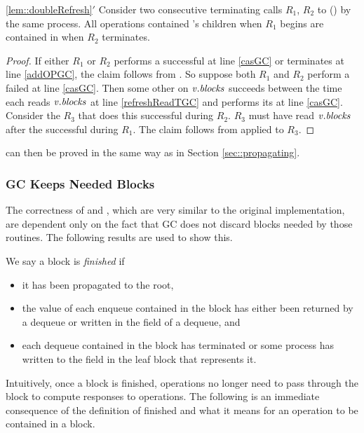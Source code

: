 \begin{customlemma}{\ref{lem::doubleRefresh}$'$}\label{lem::doubleRefreshGC}
Consider two consecutive terminating calls $R_1$, $R_2$ to () by the same process.
All operations contained 's children when $R_1$ begins
are contained in  when $R_2$ terminates.
\end{customlemma}
\begin{proof}
If either $R_1$ or $R_2$ performs a successful  at line \ref{casGC} or terminates at line \ref{addOPGC}, the claim follows
from .
So suppose both $R_1$ and $R_2$ perform a failed  at line \ref{casGC}.
Then some other  on $\mbox{\textnormal{\textit{v}}}.\mbox{\textit{blocks}}$ succeeds between the time each 
reads $\mbox{\textnormal{\textit{v}}}.\mbox{\textit{blocks}}$ at line \ref{refreshReadTGC} and performs its  at line \ref{casGC}.
Consider the  $R_3$ that does this successful  during $R_2$.
$R_3$ must have read $\mbox{\textnormal{\textit{v}}}.\mbox{\textit{blocks}}$ after the successful  during $R_1$.
The claim follows from  applied to $R_3$.
\end{proof}

 can then be proved in the same way as in Section \ref{sec::propagating}.


\subsubsection{GC Keeps Needed Blocks}

The correctness of  and , which are very similar to the 
original implementation, are dependent only on the fact that GC does not 
discard blocks needed by those routines.
The following results are used to show this.

We say a block is \emph{finished} if 
\begin{itemize}
\item
it has been propagated to the root,
\item
the value of each enqueue contained in the block has either been returned by a dequeue
or written in the  field of a dequeue, and
\item
each dequeue contained in the block has terminated or some process has written to the  field in the leaf block that represents it.
\end{itemize}
Intuitively, once a block is finished, operations no longer need to pass through the block
to compute responses to operations.
The following is an immediate consequence of the definition of finished and what it means for an operation to be contained in a block.

